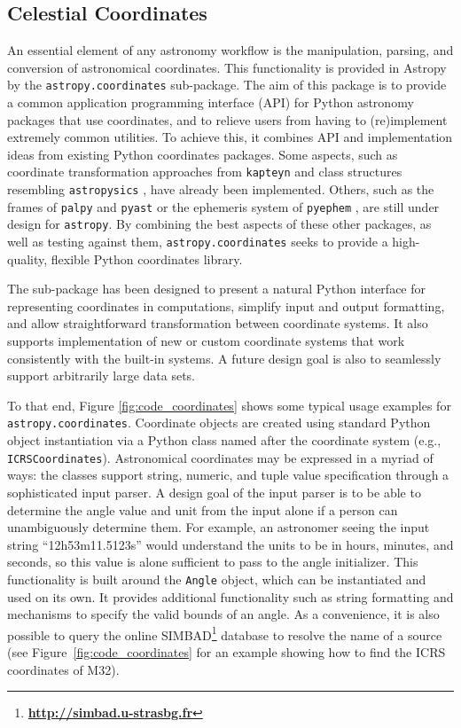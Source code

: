 \documentclass[traditabstract]{aa}
\begin{document}
\subsection{Celestial Coordinates}

\label{sec:coordinates}


An essential element of any astronomy workflow is the manipulation, parsing,
and conversion of astronomical coordinates. This functionality is provided in
Astropy by the \texttt{astropy.coordinates} sub-package. The aim of this
package is to provide a common application programming interface (API) for
Python astronomy packages that use coordinates, and to relieve users from
having to (re)implement extremely common utilities. To achieve this, it
combines API and implementation ideas from existing Python coordinates packages.
Some aspects, such as coordinate transformation approaches from
\texttt{kapteyn} \citep{kapteyn} and class structures resembling
\texttt{astropysics} \citep{astropysics}, have already been implemented.
Others, such as the frames of \texttt{palpy} \citep{palpy}
and \texttt{pyast} \citep{pyast} or the ephemeris system of
\texttt{pyephem} \citep{pyephem}, are still under design for \texttt{astropy}.
By combining the best aspects of these other packages, as well as
testing against them, \texttt{astropy.coordinates} seeks to provide a high-quality,
flexible Python coordinates library.

The sub-package has been designed to present a natural Python interface for
representing coordinates in computations, simplify input and output formatting,
and allow straightforward transformation between coordinate systems. It also
supports implementation of new or custom coordinate systems that work
consistently with the built-in systems. A future design goal is also to
seamlessly support arbitrarily large data sets.

To that end, Figure \ref{fig:code_coordinates} shows some typical usage
examples for \texttt{astropy.coordinates}. Coordinate objects are created using
standard Python object instantiation via a Python class named after the
coordinate system (e.g., \texttt{ICRSCoordinates}). Astronomical coordinates
may be expressed in a myriad of ways: the classes support string, numeric, and
tuple value specification through a sophisticated input parser. A design goal
of the input parser is to be able to determine the angle value and unit from
the input alone if a person can unambiguously determine them. For example, an
astronomer seeing the input string ``12h53m11.5123s'' would understand the
units to be in hours, minutes, and seconds, so this value is alone sufficient
to pass to the angle initializer. This functionality is built around the
\texttt{Angle} object, which can be instantiated and used on its own. It
provides additional functionality such as string formatting and mechanisms to
specify the valid bounds of an angle. As a convenience, it is also possible to
query the online SIMBAD\footnote{\textbf{\url{http://simbad.u-strasbg.fr}}} database to
resolve the name of a source (see Figure~\ref{fig:code_coordinates} for an
example showing how to find the ICRS coordinates of M32).
\end{document}
